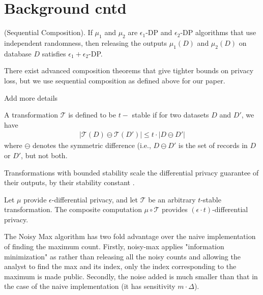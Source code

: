 \section{Background cntd}
\begin{theorem}(Sequential Composition). If $\mu_1$ and
$\mu_2$ are $\epsilon_1$-DP and $\epsilon_2$-DP algorithms that use independent randomness, then releasing the outputs $\mu_1(D)$ and
$\mu_2(D)$ on database $D$ satisfies $\epsilon_1+\epsilon_2$-DP.\end{theorem} There exist advanced composition theorems that give tighter
bounds on privacy loss, but we
use sequential composition as defined above for our paper.

Add more details


\begin{definition}A transformation $\mathcal{T}$ is defined to be $t-$ stable if for two datasets $D$ and $D'$, we have\begin{gather}|\mathcal{T}(D)\ominus \mathcal{T}(D')| \leq t \cdot |D\ominus D'|  \end{gather} where $\ominus$ denotes the symmetric difference (i.e.,  $D \ominus D'$ is the set of records in $D$ or $D'$, but not both. \end{definition}
Transformations with bounded stability scale the differential privacy guarantee of their outputs, by their stability constant \cite{PINQ}.
\begin{theorem}
Let $\mu$ provide $\epsilon$-differential privacy, and let $\mathcal{T}$
be an arbitrary $t$-stable transformation. The composite computation $\mu \circ \mathcal{T}$ provides $(\epsilon \cdot t)$-differential privacy.\end{theorem}
The Noisy Max algorithm has two fold advantage over the naive implementation of finding the maximum count.
Firstly, noisy-max applies "information minimization" as rather than releasing all the noisy counts
and allowing the analyst to find the max and its index, only the
index corresponding to the maximum is made public.
Secondly, the noise added is much smaller than that in the case of the naive implementation (it has sensitivity $m\cdot \Delta$).